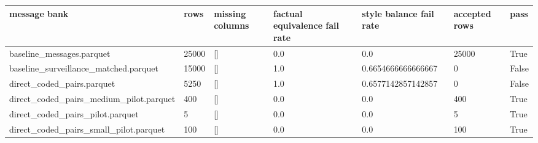 \begin{tabular}{lllllll}
\toprule
message bank & rows & missing columns & factual equivalence fail rate & style balance fail rate & accepted rows & pass \\
\midrule
baseline\_messages.parquet & 25000 & [] & 0.0 & 0.0 & 25000 & True \\
baseline\_surveillance\_matched.parquet & 15000 & [] & 1.0 & 0.6654666666666667 & 0 & False \\
direct\_coded\_pairs.parquet & 5250 & [] & 1.0 & 0.6577142857142857 & 0 & False \\
direct\_coded\_pairs\_medium\_pilot.parquet & 400 & [] & 0.0 & 0.0 & 400 & True \\
direct\_coded\_pairs\_pilot.parquet & 5 & [] & 0.0 & 0.0 & 5 & True \\
direct\_coded\_pairs\_small\_pilot.parquet & 100 & [] & 0.0 & 0.0 & 100 & True \\
\bottomrule
\end{tabular}
